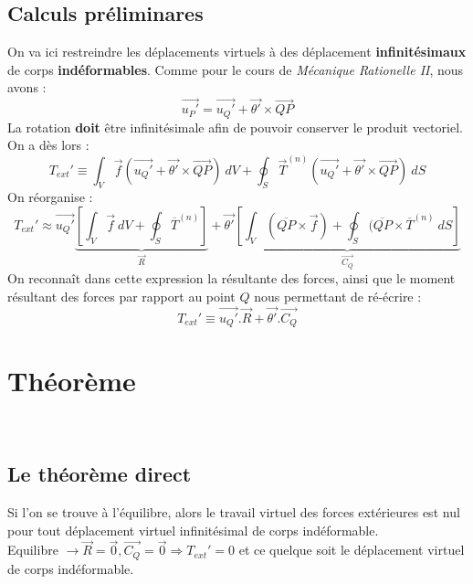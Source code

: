 	\subsection{Calculs préliminares}
	On va ici restreindre les déplacements virtuels à des déplacement \textbf{
	infinitésimaux} de corps \textbf{indéformables}. Comme pour le cours de 
	\textit{Mécanique Rationelle II}, nous avons :
	\begin{equation}
	\vec{u_P'} = \vec{u_Q'} + \vec{\theta'}\times\vec{QP}
	\end{equation}
	La rotation \textbf{doit} être infinitésimale afin de pouvoir conserver le
	produit vectoriel. On a dès lors :
	\begin{equation}
	T_{ext}' \equiv \int_V \vec{f}(\vec{u_Q'} + \vec{\theta'}\times\vec{QP})\ dV
	 + \oint_S \vec{T}^{(n)}(\vec{u_Q'} + \vec{\theta'}\times\vec{QP})\ dS
	\end{equation}	
	On réorganise :
	\begin{equation}
	T_{ext}' \approx \vec{u_Q'}\underbrace{\left[\int_V \vec{f}\ dV + \oint_S
	 \overline{T}^{(n)} \right]}_{\vec{R}} + \vec{\theta'}\underbrace{\left[
	 \int_V (\overline{QP}\times\vec{f}) + \oint_S (\overline{QP}\times
	 \overline{T}^{(n)}\ dS\right]}_{\vec{C_Q}}
	\end{equation}
	On reconnaît dans cette expression la résultante des forces, ainsi que le 
	moment résultant des forces par rapport au point $Q$ nous permettant de 
	ré-écrire :
	\begin{equation}
	T_{ext}' \equiv \vec{u_Q'}.\vec{R} + \vec{\theta'}.\vec{C_Q}
	\end{equation}
	

\section{Théorème}
\ 
	
	\subsection{Le théorème direct}
	Si l'on se trouve à l'équilibre, alors le travail virtuel des forces 
	extérieures est nul pour tout déplacement virtuel infinitésimal de 
	corps indéformable.\\
	Equilibre $\rightarrow \vec{R}=\vec{0}, \vec{C_Q}=\vec{0} \Rightarrow T_{
	ext}' = 0$ et ce quelque soit le déplacement virtuel de corps indéformable.
	
